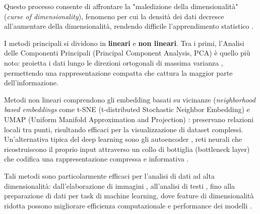 Questo processo consente di affrontare la "maledizione della 
dimensionalità" (\textit{curse of dimensionality}), fenomeno per cui la densità dei dati decresce all'au\-men\-ta\-re della dimensionalità, rendendo difficile l'apprendimento statistico \cite{hastie2009elements}.

I metodi principali si dividono in \textbf{lineari} e \textbf{non lineari}. Tra i primi, l'Analisi delle Componenti Principali (Principal Component Analysis, PCA) è quello più noto: proietta i dati lungo le direzioni ortogonali di massima varianza \cite{jolliffe2002principal}, permettendo una rappresentazione compatta che cattura la maggior parte dell'informazione. 

Metodi non lineari comprendono gli embedding basati su vicinanze (\textit{neigh\-bor\-hood based embeddings} come t-SNE (t-distributed Stochastic Neighbor Embedding) \cite{maaten2008visualizing} e UMAP (Uniform Manifold Approximation and Projection) \cite{mcinnes2018umap}: preservano relazioni locali tra punti, risultando efficaci per la visualizzazione di dataset complessi. Un'alternativa tipica del deep learning sono gli autoencoder \cite{murphy2012}, reti neurali che ricostruiscono il proprio input attraverso un collo di bottiglia (bottleneck layer) che codifica una rappresentazione compressa e informativa \cite{goodfellow2016deep}.

Tali metodi sono particolarmente efficaci per l'analisi di dati ad alta dimensionalità: dall'elaborazione di immagini \cite{van2009dimensionality}, all'analisi di testi \cite{blei2003latent}, fino alla preparazione di dati per task di machine learning, dove feature di dimensionalità ridotta possono migliorare efficienza computazionale e performance dei modelli \cite{hastie2009elements}.






